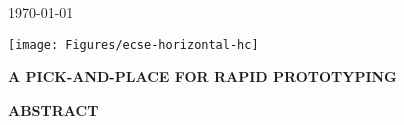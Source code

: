 \documentclass[12pt,british,UKenglish]{article}
\begin{document}
\vspace*{\fill}

\begin{center}
    \cleanlookdateon \today
    \par
\end{center}
\vspace*{\fill}
\begin{center}
    \texttt{[image: Figures/ecse-horizontal-hc]}
    \par
\end{center}

\newpage{}


\begin{flushleft}
    \reportNumber
    \par
\end{flushleft}
\vspace{1em}

\begin{center}
    \textbf{\textsc{\large{}A PICK-AND-PLACE FOR RAPID PROTOTYPING}}{\large\par}
    \par
\end{center}

\vspace{2em}

\begin{center}
    \textbf{\large{}\name}{\large\par}
    \par
\end{center}

\vspace{2em}

\begin{center}
    \textbf{\textsc{\large{}ABSTRACT}}{\large\par}
    \par
\end{center}

\end{document}
